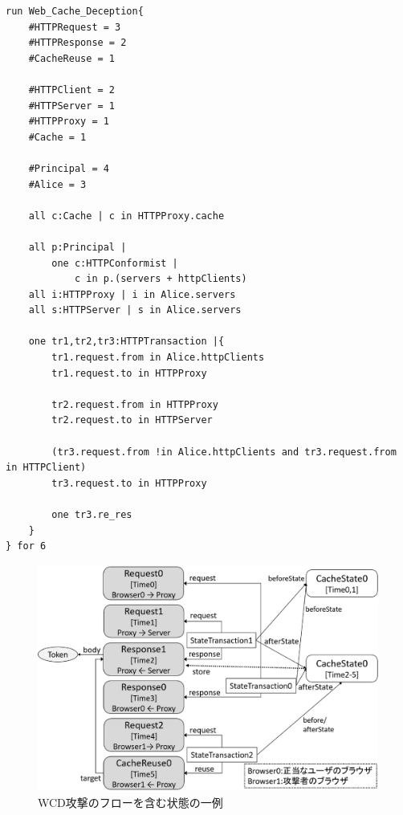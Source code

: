 \documentclass[12pt,a4paper]{jbook}
\begin{document}
\begin{lstlisting}[caption=WCD攻撃の表現, label=code:WCD]
run Web_Cache_Deception{
	#HTTPRequest = 3
	#HTTPResponse = 2
	#CacheReuse = 1

	#HTTPClient = 2
	#HTTPServer = 1
	#HTTPProxy = 1
	#Cache = 1

	#Principal = 4
	#Alice = 3

	all c:Cache | c in HTTPProxy.cache

	all p:Principal |
		one c:HTTPConformist |
			c in p.(servers + httpClients)
	all i:HTTPProxy | i in Alice.servers
	all s:HTTPServer | s in Alice.servers

	one tr1,tr2,tr3:HTTPTransaction |{
		tr1.request.from in Alice.httpClients
		tr1.request.to in HTTPProxy

		tr2.request.from in HTTPProxy
		tr2.request.to in HTTPServer

		(tr3.request.from !in Alice.httpClients and tr3.request.from in HTTPClient)
		tr3.request.to in HTTPProxy

		one tr3.re_res
	}
} for 6
\end{lstlisting}

\begin{figure}[htb]
\centering
\includegraphics[width=450pt]{./fig/WCD_alloy.eps}
\caption{WCD攻撃のフローを含む状態の一例}
\label{fig:WCD_alloy}
\end{figure}
\end{document}
